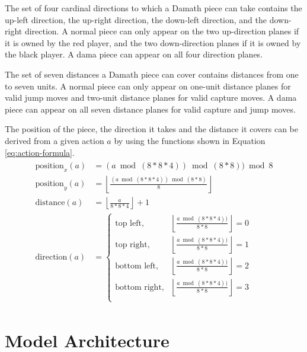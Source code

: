 The set of four cardinal directions to which a Damath piece can take contains the up-left direction, the up-right direction, the down-left direction, and the down-right direction. A normal piece can only appear on the two up-direction planes if it is owned by the red player, and the two down-direction planes if it is owned by the black player. A dama piece can appear on all four direction planes.

The set of seven distances a Damath piece can cover contains distances from one to seven units. A normal piece can only appear on one-unit distance planes for valid jump moves and two-unit distance planes for valid capture moves. A dama piece can appear on all seven distance planes for valid capture and jump moves. 

The position of the piece, the direction it takes and the distance it covers can be derived from a given action $a$ by using the functions shown in Equation \ref{eq:action-formula}.
\begin{align} 
    \begin{split}
        \text{position}_x(a) &= (a \bmod (8 * 8 * 4)) \bmod (8 * 8)) \bmod 8 \\
        \text{position}_y(a) &= \left\lfloor \frac{(a \bmod (8 * 8 * 4)) \bmod (8 * 8)}{8} \right\rfloor\\
        \text{distance}(a) &= \left\lfloor \frac{a}{8 * 8 * 4}\right\rfloor + 1 \\
        \text{direction}(a) &= 
        \begin{cases}
            \text{top left}, & \left\lfloor \frac{a \bmod (8 * 8 * 4))}{8 * 8} \right\rfloor = 0 \\
            \text{top right}, & \left\lfloor \frac{a \bmod (8 * 8 * 4))}{8 * 8} \right\rfloor = 1\\
            \text{bottom left}, & \left\lfloor \frac{a \bmod (8 * 8 * 4))}{8 * 8} \right\rfloor = 2\\
            \text{bottom right}, & \left\lfloor \frac{a \bmod (8 * 8 * 4))}{8 * 8} \right\rfloor = 3\\
        \end{cases}
    \end{split}
    \label{eq:action-formula}
\end{align}

\section{Model Architecture}

